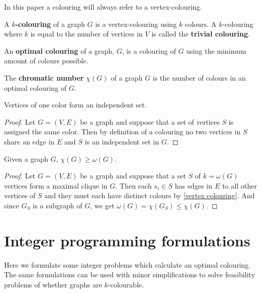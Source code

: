 \noindent In this paper a colouring will always refer to a vertex-colouring.
\begin{definition}
A \textbf{$k$-colouring} of a graph $G$ is a vertex-colouring using $k$ colours. A $k$-colouring where $k$ is equal to the number of vertices in $V$ is called the \textbf{trivial colouring}.
\end{definition}
\begin{definition}\label{optimal colouring}
An \textbf{optimal colouring} of a graph, $G$, is a colouring of $G$ using the minimum amount of colours possible.
\end{definition}
\begin{definition}\label{cromatic number}
The \textbf{chromatic number} $\chi (G)$ of a graph $G$ is the number of colours in an optimal colouring of $G$.
\end{definition}
\begin{theorem}
Vertices of one color form an independent set.
\begin{proof}
Let $G=(V,E)$ be a graph and suppose that a set of vertices $S$ is assigned the same color. Then by definition of a colouring no two vertices in $S$ share an edge in $E$ and $S$ is an independent set in $G$.
\end{proof}
\end{theorem}
\begin{theorem}
Given a graph $G$, $\chi (G) \geq \omega(G)$.
\begin{proof}
Let $G=(V,E)$ be a graph and suppose that a set $S$ of $k = \omega(G)$ vertices form a maximal clique in $G$. Then each $s_i \in S$ has edges in $E$ to all other vertices of $S$ and they must each have distinct colours by \ref{vertex colouring}. And since $G_S$ is a subgraph of $G$, we get $\omega(G)= \chi(G_S) \leq \chi(G)$.
\end{proof}
\end{theorem}
\section{Integer programming formulations}
Here we formulate some integer problems which calculate an optimal colouring. The same formulations can be used with minor simplifications to solve feasibility problems of whether graphs are $k$-colourable.\\

